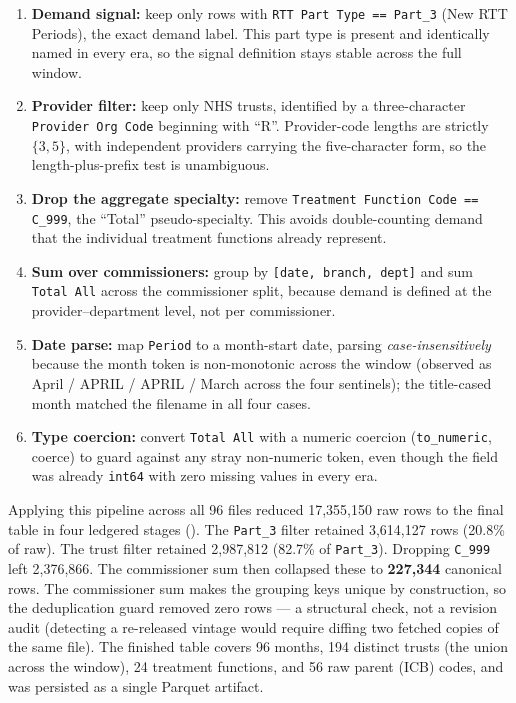 \documentclass[11pt,a4paper]{article}
\begin{document}
\begin{enumerate}[nosep]
  \item \textbf{Demand signal:} keep only rows with \texttt{RTT Part Type == Part\_3} (New RTT Periods), the exact demand label. This part type is present and identically named in every era, so the signal definition stays stable across the full window.
  \item \textbf{Provider filter:} keep only NHS trusts, identified by a three-character \texttt{Provider Org Code} beginning with ``R''. Provider-code lengths are strictly $\{3,5\}$, with independent providers carrying the five-character form, so the length-plus-prefix test is unambiguous.
  \item \textbf{Drop the aggregate specialty:} remove \texttt{Treatment Function Code == C\_999}, the ``Total'' pseudo-specialty. This avoids double-counting demand that the individual treatment functions already represent.
  \item \textbf{Sum over commissioners:} group by \texttt{[date, branch, dept]} and sum \texttt{Total All} across the commissioner split, because demand is defined at the provider--department level, not per commissioner.
  \item \textbf{Date parse:} map \texttt{Period} to a month-start date, parsing \emph{case-insensitively} because the month token is non-monotonic across the window (observed as April / APRIL / APRIL / March across the four sentinels); the title-cased month matched the filename in all four cases.
  \item \textbf{Type coercion:} convert \texttt{Total All} with a numeric coercion (\texttt{to\_numeric}, coerce) to guard against any stray non-numeric token, even though the field was already \texttt{int64} with zero missing values in every era.
\end{enumerate}

Applying this pipeline across all 96 files reduced 17,355,150 raw rows to the final table in four ledgered stages (). The \texttt{Part\_3} filter retained 3,614,127 rows (20.8\% of raw). The trust filter retained 2,987,812 (82.7\% of \texttt{Part\_3}). Dropping \texttt{C\_999} left 2,376,866. The commissioner sum then collapsed these to \textbf{227,344} canonical rows. The commissioner sum makes the grouping keys unique by construction, so the deduplication guard removed zero rows --- a structural check, not a revision audit (detecting a re-released vintage would require diffing two fetched copies of the same file). The finished table covers 96 months, 194 distinct trusts (the union across the window), 24 treatment functions, and 56 raw parent (ICB) codes, and was persisted as a single Parquet artifact.
\end{document}
